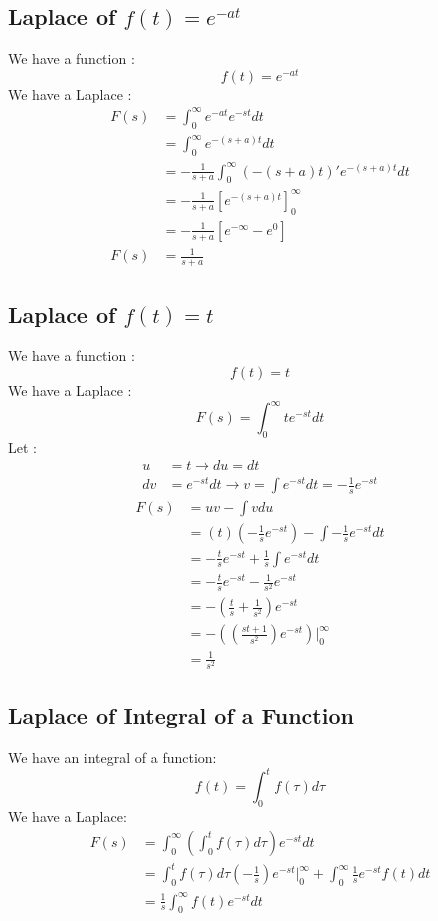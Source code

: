 \subsection{Laplace of $f(t) = e^{-at}$}
We have a function :
\[
f(t) = e^{-at}
\]
We have a Laplace :
\[
\begin{split}
	F(s) &= \int_{0}^{\infty} e^{-at} e^{-st} dt \\
	&= \int_{0}^{\infty} e^{-(s+a)t} dt \\
	&= -\frac{1}{s+a} \int_{0}^{\infty} (-(s+a)t)' e^{-(s+a)t} dt \\
	&= -\frac{1}{s+a} \left[e^{-(s+a)t}\right]_0^\infty  \\
	&= -\frac{1}{s+a} \left[e^{-\infty} - e^0\right]  \\
	F(s) &= \frac{1}{s+a}
\end{split}
\]

\subsection{Laplace of $f(t) = t$}
We have a function :
\[
f(t) = t
\]
We have a Laplace :
\[
F(s) = \int_{0}^{\infty} t e^{-st} dt
\]
Let :
\[
\begin{split}
	u &= t \rightarrow du = dt\\
	dv &= e^{-st} dt \rightarrow v = \int e^{-st}dt = -\frac{1}{s} e^{-st}
\end{split}
\]
\[
\begin{split}
	F(s) &= uv - \int vdu \\
	&= (t) (-\frac{1}{s} e^{-st}) - \int -\frac{1}{s} e^{-st} dt \\
	&= -\frac{t}{s} e^{-st} +\frac{1}{s} \int e^{-st} dt \\
	&= -\frac{t}{s} e^{-st} -\frac{1}{s^2} e^{-st} \\
	&= -(\frac{t}{s} +\frac{1}{s^2}) e^{-st} \\
	&= -\left((\frac{st+1}{s^2}) e^{-st} \right) |_0^\infty \\
	&= \frac{1}{s^2}
\end{split}
\]

\subsection{Laplace of Integral of a Function}
We have an integral of a function:
\[
f(t) = \int_{0}^{t} f(\tau) d\tau
\]
We have a Laplace:
\[
\begin{split}
	F(s) &= \int_{0}^{\infty} (\int_{0}^{t} f(\tau) d\tau) e^{-st} dt \\
	&= \int_{0}^{t} f(\tau) d\tau (-\frac{1}{s}) e^{-st} |_0^\infty + \int_{0}^{\infty} \frac{1}{s} e^{-st} f(t) dt \\
	&= \frac{1}{s} \int_{0}^{\infty} f(t) e^{-st} dt
\end{split}
\]

